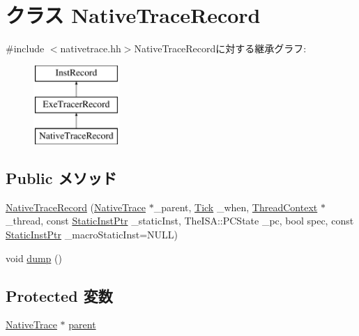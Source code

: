 \hypertarget{classTrace_1_1NativeTraceRecord}{
\section{クラス NativeTraceRecord}
\label{classTrace_1_1NativeTraceRecord}
}


{\ttfamily \#include $<$nativetrace.hh$>$}NativeTraceRecordに対する継承グラフ:\begin{figure}[H]
\begin{center}
\leavevmode
\includegraphics[height=3cm]{classTrace_1_1NativeTraceRecord}
\end{center}
\end{figure}
\subsection*{Public メソッド}
\begin{DoxyCompactItemize}
\item 
\hyperlink{classTrace_1_1NativeTraceRecord_a93fa63c8fcf1be196cc993939b2c41ff}{NativeTraceRecord} (\hyperlink{classTrace_1_1NativeTrace}{NativeTrace} $\ast$\_\-parent, \hyperlink{base_2types_8hh_a5c8ed81b7d238c9083e1037ba6d61643}{Tick} \_\-when, \hyperlink{classThreadContext}{ThreadContext} $\ast$\_\-thread, const \hyperlink{classRefCountingPtr}{StaticInstPtr} \_\-staticInst, TheISA::PCState \_\-pc, bool spec, const \hyperlink{classRefCountingPtr}{StaticInstPtr} \_\-macroStaticInst=NULL)
\item 
void \hyperlink{classTrace_1_1NativeTraceRecord_accd2600060dbaee3a3b41aed4034c63c}{dump} ()
\end{DoxyCompactItemize}
\subsection*{Protected 変数}
\begin{DoxyCompactItemize}
\item 
\hyperlink{classTrace_1_1NativeTrace}{NativeTrace} $\ast$ \hyperlink{classTrace_1_1NativeTraceRecord_a230d57514a137a26f65ed0c89a3cbd2f}{parent}
\end{DoxyCompactItemize}


